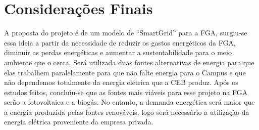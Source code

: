 \chapter[Considerações Finais]{Considerações Finais}

A proposta do projeto é de um modelo de “SmartGrid” para a FGA, surgiu-se essa ideia a partir da necessidade de reduzir os gastos energéticos da FGA, diminuir as perdas energéticas e aumentar a sustentabilidade para o meio ambiente que o cerca. Será utilizada duas fontes alternativas de energia para que elas trabalhem paralelamente para que não falte energia para o Campus e que não dependemos totalmente da energia elétrica que a CEB produz. Após os estudos feitos, concluiu-se que as fontes mais viáveis para esse projeto na FGA serão a fotovoltaica e a biogás. No entanto, a demanda energética será maior que a energia produzida pelas fontes renováveis, logo será necessário a utilização da energia elétrica proveniente da empresa privada.